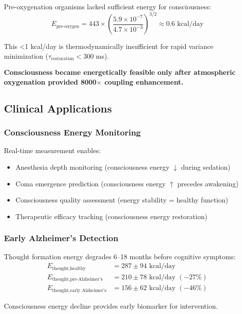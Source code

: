 \documentclass[12pt,twocolumn]{article}
\theoremstyle{remark}
\begin{document}
Pre-oxygenation organisms lacked sufficient energy for consciousness:
\begin{equation}
E_{\text{pre-oxygen}} = 443 \times \left(\frac{5.9 \times 10^{-7}}{4.7 \times 10^{-3}}\right)^{3/2} \approx 0.6 \text{ kcal/day}
\end{equation}

This <1 kcal/day is thermodynamically insufficient for rapid variance minimization ($\tau_{\text{restoration}} < 300$ ms). 

\textbf{Consciousness became energetically feasible only after atmospheric oxygenation provided 8000$\times$ coupling enhancement.}

\subsection{Clinical Applications}

\subsubsection{Consciousness Energy Monitoring}

Real-time measurement enables:
\begin{itemize}
\item Anesthesia depth monitoring (consciousness energy $\downarrow$ during sedation)
\item Coma emergence prediction (consciousness energy $\uparrow$ precedes awakening)
\item Consciousness quality assessment (energy stability = healthy function)
\item Therapeutic efficacy tracking (consciousness energy restoration)
\end{itemize}

\subsubsection{Early Alzheimer's Detection}

Thought formation energy degrades 6--18 months before cognitive symptoms:
\begin{align}
E_{\text{thought,healthy}} &= 287 \pm 94 \text{ kcal/day} \\
E_{\text{thought,pre-Alzheimer's}} &= 210 \pm 78 \text{ kcal/day } (-27\%) \\
E_{\text{thought,early Alzheimer's}} &= 156 \pm 62 \text{ kcal/day } (-46\%)
\end{align}

Consciousness energy decline provides early biomarker for intervention.
\end{document}
